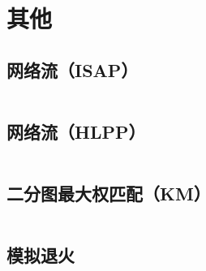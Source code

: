 \documentclass[a4paper,9]{article}
\begin{document}
\section{其他}
\subsection{网络流（ISAP）}
\inputminted[breaklines]{c++}{others/isap.cpp}
\subsection{网络流（HLPP）}
\inputminted[breaklines]{c++}{others/hlpp.cpp}
\subsection{二分图最大权匹配（KM）}
\inputminted[breaklines]{c++}{others/KM.cpp}
\subsection{模拟退火}
\inputminted[breaklines]{c++}{others/simulate_anneal.cpp}

\end{document}
